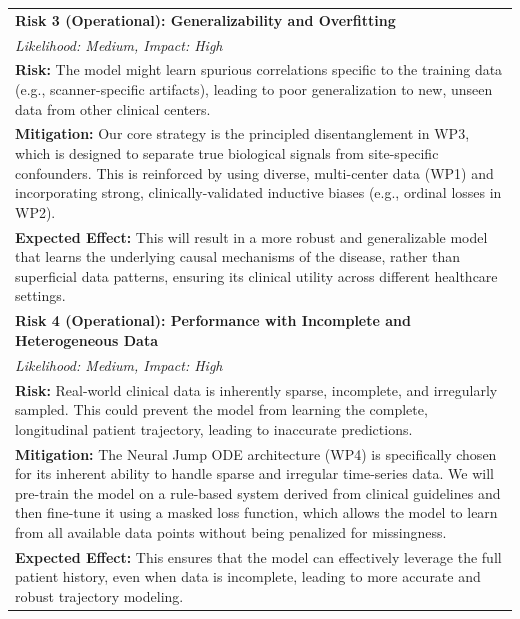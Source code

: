 \documentclass[11pt, a4paper]{article}
\begin{document}
\begin{longtable}{p{}}
\textbf{Risk 3 (Operational): Generalizability and Overfitting} \\
\textit{Likelihood: Medium, Impact: High} \\
\textbf{Risk:} The model might learn spurious correlations specific to the training data (e.g., scanner-specific artifacts), leading to poor generalization to new, unseen data from other clinical centers. \\
\textbf{Mitigation:} Our core strategy is the principled disentanglement in WP3, which is designed to separate true biological signals from site-specific confounders. This is reinforced by using diverse, multi-center data (WP1) and incorporating strong, clinically-validated inductive biases (e.g., ordinal losses in WP2). \\
\textbf{Expected Effect:} This will result in a more robust and generalizable model that learns the underlying causal mechanisms of the disease, rather than superficial data patterns, ensuring its clinical utility across different healthcare settings. \\
\addlinespace

\textbf{Risk 4 (Operational): Performance with Incomplete and Heterogeneous Data} \\
\textit{Likelihood: Medium, Impact: High}\\
\textbf{Risk:} Real-world clinical data is inherently sparse, incomplete, and irregularly sampled. This could prevent the model from learning the complete, longitudinal patient trajectory, leading to inaccurate predictions. \\
\textbf{Mitigation:} The Neural Jump ODE architecture (WP4) is specifically chosen for its inherent ability to handle sparse and irregular time-series data. We will pre-train the model on a rule-based system derived from clinical guidelines and then fine-tune it using a masked loss function, which allows the model to learn from all available data points without being penalized for missingness. \\
\textbf{Expected Effect:} This ensures that the model can effectively leverage the full patient history, even when data is incomplete, leading to more accurate and robust trajectory modeling. \\
\bottomrule
\end{longtable}
\end{document}
